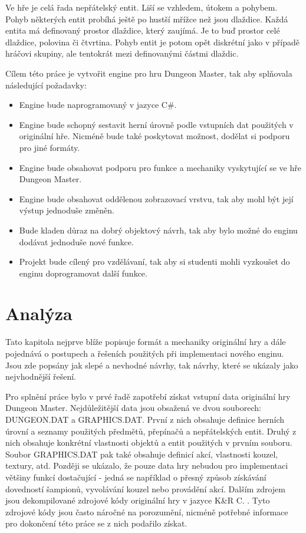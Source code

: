 Ve hře je celá řada nepřátelský entit. Liší se vzhledem, útokem a pohybem. Pohyb některých entit 
probíhá ještě po hustší mřížce než jsou dlaždice. Každá entita má definovaný prostor dlaždice, který zaujímá. Je to buď prostor
celé dlaždice, polovina či čtvrtina.  Pohyb entit je potom opět diskrétní jako v případě hráčovi skupiny, 
ale tentokrát mezi definovanými částmi dlaždic. 


Cílem této práce je vytvořit engine pro hru Dungeon Master, tak aby splňovala následující požadavky:
\begin{itemize}
\item Engine bude naprogramovaný v jazyce C\#.
\item Engine bude schopný sestavit herní úrovně podle vstupních dat použitých v originální hře. Nicméně
	bude také poskytovat možnost, dodělat si podporu pro jiné formáty.
\item Engine bude obsahovat podporu pro funkce a mechaniky vyskytující se ve hře Dungeon Master.
\item Engine bude obsahovat oddělenou zobrazovací vrstvu, tak aby mohl být její výstup jednoduše změněn.
\item Bude kladen důraz na dobrý objektový návrh, tak aby bylo možné do enginu dodávat jednoduše nové funkce.
\item Projekt bude cílený pro vzdělávaní, tak aby si studenti mohli vyzkoušet do enginu doprogramovat další funkce.
\end{itemize}

\chapter{Analýza}

Tato kapitola nejprve blíže popisuje formát a mechaniky originální hry a dále pojednává o postupech a řešeních použitých 
při implementaci nového enginu. Jsou zde popsány jak slepé a nevhodné návrhy, tak návrhy, které se ukázaly 
jako nejvhodnější řešení.

Pro splnění práce bylo v prvé řadě zapotřebí získat vstupní data originální hry Dungeon Master. Nejdůležitější data 
jsou obsažená ve dvou souborech: DUNGEON.DAT a GRAPHICS.DAT. První z nich obsahuje definice herních úrovní a seznamy 
použitých předmětů, přepínačů a nepřátelských entit. Druhý z nich obsahuje konkrétní vlastnosti objektů a entit použitých v prvním souboru. 
Soubor GRAPHICS.DAT pak také obsahuje definicí akcí, vlastnosti kouzel, textury, atd. Později se ukázalo, že pouze data hry nebudou
pro implementaci většiny funkcí dostačující - jedná se například o přesný způsob získávání dovedností šampionů, 
vyvolávání kouzel nebo provádění akcí. Dalším zdrojem jsou dekompilované zdrojové kódy  originální hry v jazyce K&R C. . 
Tyto zdrojové kódy jsou často náročné na porozumění, nicméně potřebné informace pro dokončení této práce se z nich podařilo získat.

